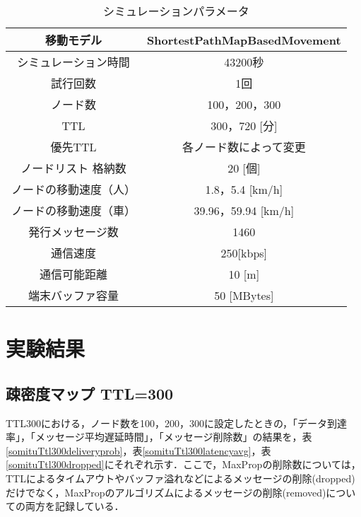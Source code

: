 \documentclass[11pt]{icsthesis}
\begin{document}
\begin{table}[h]
    \begin{center}
      \caption[]{シミュレーションパラメータ}
      \label{simpara}
      \begin{tabular}{|c|c|}
        \hline
        移動モデル & ShortestPathMapBasedMovement\\
        \hline
        シミュレーション時間 & 43200秒\\
        \hline
        試行回数 & 1回\\
        \hline
        ノード数 & 100，200，300\\
        \hline
        TTL & 300，720 [分]\\
        \hline
        優先TTL & 各ノード数によって変更\\
        \hline
        ノードリスト
        格納数 & 20 [個]\\
        \hline
        ノードの移動速度（人） & 1.8，5.4 [km/h]\\
        \hline
        ノードの移動速度（車） & 39.96，59.94 [km/h]\\
        \hline
        発行メッセージ数 & 1460\\
        \hline
        通信速度 & 250[kbps]\\
        \hline
        通信可能距離 & 10 [m]\\
        \hline
        端末バッファ容量 & 50 [MBytes]\\
        \hline
      \end{tabular}
    \end{center}
\end{table}
\chapter{実験結果}

\section{疎密度マップ TTL=300}
TTL300における，ノード数を100，200，300に設定したときの，「データ到達率」，「メッセージ平均遅延時間」，「メッセージ削除数」の結果を，表\ref{somituTtl300deliveryprob}，表\ref{somituTtl300latencyavg}，表\ref{somituTtl300dropped}にそれぞれ示す．ここで，MaxPropの削除数については，TTLによるタイムアウトやバッファ溢れなどによるメッセージの削除(dropped)だけでなく，MaxPropのアルゴリズムによるメッセージの削除(removed)についての両方を記録している．
\end{document}
